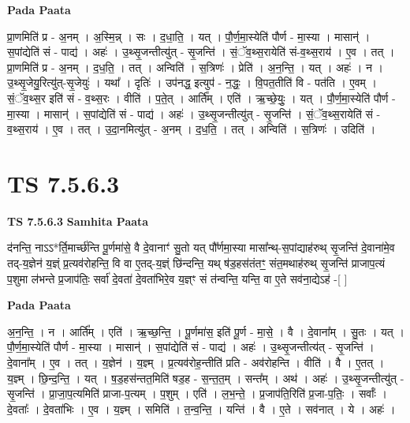 \documentclass[17pt]{extarticle}
\begin{document}
\textbf{Pada Paata} \newline

प्रा॒णमिति॑ प्र - अ॒नम् । अ॒स्मि॒न्न् । सः । द॒धा॒ति॒ । यत् । पौ॒र्ण॒मा॒स्येति॑ पौर्ण - मा॒स्या । मासान्॑ । स॒पांद्येति॑ सं - पाद्य॑ । अहः॑ । उ॒थ्सृ॒जन्तीत्यु॑त् - सृ॒जन्ति॑ । सं॒ॅव॒थ्स॒रायेति॑ सं-व॒थ्स॒राय॑ । ए॒व । तत् । प्रा॒णमिति॑ प्र - अ॒नम् । द॒ध॒ति॒ । तत् । अन्विति॑ । स॒त्रिणः॑ । प्रेति॑ । अ॒न॒न्ति॒ । यत् । अहः॑ । न । उ॒थ्सृ॒जेयु॒रित्यु॑त्-सृ॒जेयुः॑ । यथा᳚ । दृतिः॑ । उप॑नद्ध॒ इत्युप॑ - न॒द्धः॒ । वि॒पत॒तीति॑ वि - पत॑ति । ए॒वम् । सं॒ॅव॒थ्स॒र इति॑ सं - व॒थ्स॒रः । वीति॑ । प॒ते॒त् । आर्ति᳚म् । एति॑ । ऋ॒च्छे॒युः॒ । यत् । पौ॒र्ण॒मा॒स्येति॑ पौर्ण - मा॒स्या । मासान्॑ । स॒पांद्येति॑ सं - पाद्य॑ । अहः॑ । उ॒थ्सृ॒जन्तीत्यु॑त् - सृ॒जन्ति॑ । सं॒ॅव॒थ्स॒रायेति॑ सं - व॒थ्स॒राय॑ । ए॒व । तत् । उ॒दा॒नमित्यु॑त् - अ॒नम् । द॒ध॒ति॒ । तत् । अन्विति॑ । स॒त्रिणः॑ । उदिति॑ ।  \newline




\section*{ TS 7.5.6.3 }

\textbf{TS 7.5.6.3 } \newline
\textbf{Samhita Paata} \newline

द॑नन्ति॒ नाऽऽ*र्ति॒मार्च्छ॑न्ति पू॒र्णमा॑से॒ वै दे॒वानाꣳ॑ सु॒तो यत् पौ᳚र्णमा॒स्या मासा᳚न्थ्-स॒पांद्याह॑रुथ् सृ॒जन्ति॑ दे॒वाना॑मे॒व तद्-य॒ज्ञेन॑ य॒ज्ञ्ं प्र॒त्यव॑रोहन्ति॒ वि वा ए॒तद्-य॒ज्ञ्ं छि॑न्दन्ति॒ यथ् ष॑ड॒हस॑तंतꣳ॒॒ संत॒मथाह॑रुथ् सृ॒जन्ति॑ प्राजाप॒त्यं प॒शुमा ल॑भन्ते प्र॒जाप॑तिः॒ सर्वा॑ दे॒वता॑ दे॒वता॑भिरे॒व य॒ज्ञ्ꣳ सं त॑न्वन्ति॒ यन्ति॒ वा ए॒ते सव॑ना॒द्येऽह॑ -[  ] \newline

\textbf{Pada Paata} \newline

अ॒न॒न्ति॒ । न । आर्ति᳚म् । एति॑ । ऋ॒च्छ॒न्ति॒ । पू॒र्णमा॑स॒ इति॑ पू॒र्ण - मा॒से॒ । वै । दे॒वाना᳚म् । सु॒तः । यत् । पौ॒र्ण॒मा॒स्येति॑ पौर्ण - मा॒स्या । मासान्॑ । स॒पांद्येति॑ सं - पाद्य॑ । अहः॑ । उ॒थ्सृ॒जन्तीत्य॑त् - सृ॒जन्ति॑ । दे॒वाना᳚म् । ए॒व । तत् । य॒ज्ञेन॑ । य॒ज्ञ्म् । प्र॒त्यव॑रोह॒न्तीति॑ प्रति - अव॑रोहन्ति । वीति॑ । वै । ए॒तत् । य॒ज्ञ्म् । छि॒न्द॒न्ति॒ । यत् । ष॒ड॒हस॑न्तत॒मिति॑ षड॒ह - स॒न्त॒त॒म् । सन्त᳚म् । अथ॑ । अहः॑ । उ॒थ्सृ॒जन्तीत्यु॑त् - सृ॒जन्ति॑ । प्रा॒जा॒प॒त्यमिति॑ प्राजा-प॒त्यम् । प॒शुम् । एति॑ । ल॒भ॒न्ते॒ । प्र॒जाप॑ति॒रिति॑ प्र॒जा-प॒तिः॒ । सर्वाः᳚ । दे॒वताः᳚ । दे॒वता॑भिः । ए॒व । य॒ज्ञ्म् । समिति॑ । त॒न्व॒न्ति॒ । यन्ति॑ । वै । ए॒ते । सव॑नात् । ये । अहः॑ ।  \newline
\end{document}
